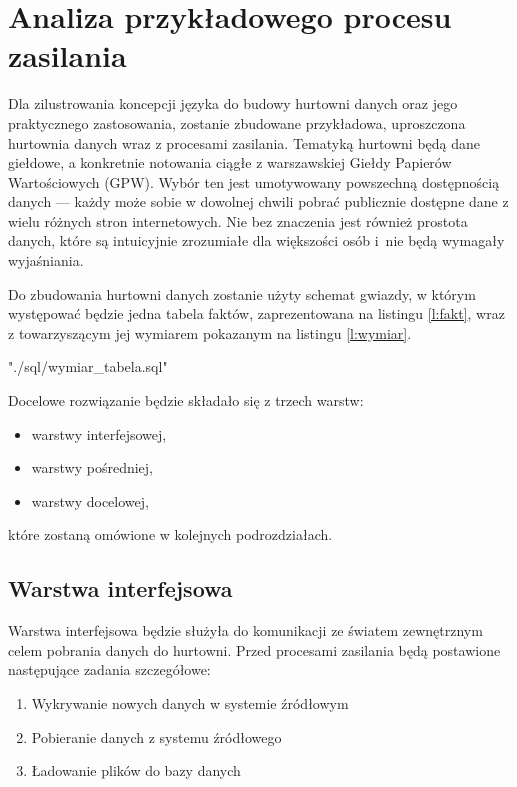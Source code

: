 \section{Analiza przykładowego procesu zasilania}
Dla zilustrowania koncepcji języka do budowy hurtowni danych oraz jego praktycznego zastosowania,
 zostanie zbudowane przykładowa,
 uproszczona hurtownia danych wraz z procesami zasilania. 
Tematyką hurtowni będą dane giełdowe,
 a konkretnie notowania ciągłe z warszawskiej Giełdy Papierów Wartościowych (GPW).
Wybór ten jest umotywowany powszechną dostępnością danych ---
 każdy może sobie w dowolnej chwili pobrać publicznie dostępne dane z wielu różnych stron internetowych.
Nie bez znaczenia jest również prostota danych, które są intuicyjnie zrozumiałe dla większości osób 
 i~nie będą wymagały wyjaśniania.

Do zbudowania hurtowni danych zostanie użyty schemat gwiazdy, 
 w którym występować będzie jedna tabela faktów, zaprezentowana na listingu \ref{l:fakt},
 wraz z towarzyszącym jej wymiarem pokazanym na listingu \ref{l:wymiar}.
 
 {"./sql/wymiar_tabela.sql"} 

 
Docelowe rozwiązanie będzie składało się z trzech warstw:
 \begin{itemize}
  \item warstwy interfejsowej,
  \item warstwy pośredniej,
  \item warstwy docelowej,
 \end{itemize}
które zostaną omówione w kolejnych podrozdziałach.

\subsection{Warstwa interfejsowa}

Warstwa interfejsowa będzie służyła do komunikacji ze światem zewnętrznym celem pobrania danych do hurtowni. 
Przed procesami zasilania będą postawione następujące zadania szczegółowe:
\begin{enumerate}
 \item \label{w_intf:wykrywanie}
 Wykrywanie nowych danych w systemie źródłowym
 \item \label{w_inf:pobieranie}
 Pobieranie danych z systemu źródłowego
 \item \label{w_intf_ladowanie}
Ładowanie plików do bazy danych                 
        
\end{enumerate}

